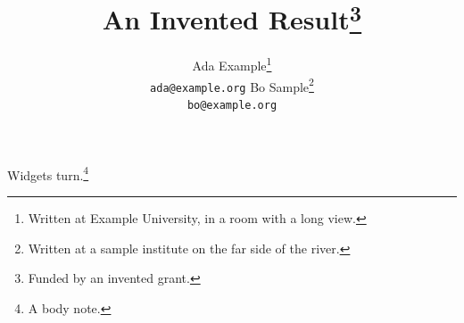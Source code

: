 \documentclass{article}
\title{An Invented Result\thanks{Funded by an invented grant.}}
\author{Ada Example\thanks{Written at Example University, in a room with a long view.} \\ \texttt{ada@example.org} \And Bo Sample\thanks{Written at a sample institute on the far side of the river.} \\ \texttt{bo@example.org}}
\begin{document}
\maketitle
Widgets turn.\footnote{A body note.}
\end{document}
